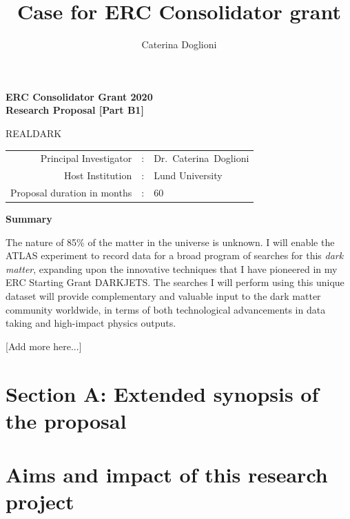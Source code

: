 \documentclass[11pt,a4paper]{article}
\title{{\Large Case for ERC Consolidator grant}}
\author{{\normalsize Caterina Doglioni}}
\date{}                                           %
\begin{document}
\begin{center} 

{\Large\bf ERC Consolidator Grant 2020} \\
	{\Large\bf Research Proposal [Part B1]}  \\
 
\vspace{2cm} 
{\huge {\bf }}   \smallskip  

\vspace{2cm} 
{\Huge{REALDARK}} \\ 
\vspace{1cm} 
\vspace{1cm}
\end{center} 
\begin{tabular}{rcl}
Principal Investigator & : & Dr.~Caterina~Doglioni \\
Host Institution & : & Lund University \\ 
Proposal duration in months & : & 60 \\
\end{tabular}  
\vspace{2cm}


\begin{center} {\bf Summary}  \end{center}

The nature of 85\% of the matter in the universe is unknown. I will enable the ATLAS experiment to record data for a broad program of searches for this \textit{dark matter}, expanding upon the innovative techniques that I have pioneered in my ERC Starting Grant DARKJETS. 
The searches I will perform using this unique dataset will provide complementary and valuable input to the dark matter community worldwide, in terms of both technological advancements in data taking and high-impact physics outputs. 

[Add more here...]

\clearpage

\section*{Section A: Extended synopsis of the proposal} 

\medskip

\section{Aims and impact of this research project} 
\smallskip
\end{document}
